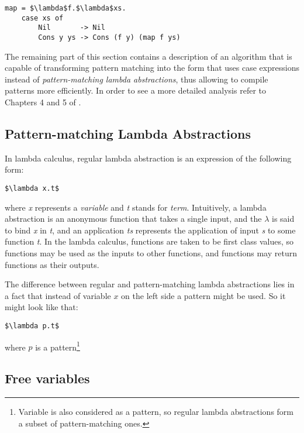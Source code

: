 \documentclass[12pt,a4paper]{report}
\begin{document}
\hspace*{-1.5in}
\begin{lstlisting}[style=haskell,mathescape=true]
map = $\lambda$f.$\lambda$xs.
    case xs of
        Nil       -> Nil
        Cons y ys -> Cons (f y) (map f ys)
\end{lstlisting}

The remaining part of this section contains a description of an algorithm that
is capable of transforming pattern matching into the form that uses case
expressions instead of \textit{pattern-matching lambda abstractions}, thus allowing to
compile patterns more efficiently. In order to see a more detailed analysis
refer to Chapters 4 and 5 of \cite{Jon87}.

\subsection{Pattern-matching Lambda Abstractions}
In lambda calculus, regular lambda abstraction is an expression of the
following form:

\hspace*{-1.5in}
\begin{lstlisting}[style=haskell,mathescape=true]
$\lambda x.t$
\end{lstlisting}
where \textit{x} represents a \textit{variable} and \textit{t} stands for
\textit{term}. Intuitively, a lambda abstraction is an anonymous function that
takes a single input, and the \(\lambda\) is said to bind \textit{x} in
\textit{t}, and an application \textit{ts} represents the application of input
\textit{s} to some function \textit{t}. In the lambda calculus, functions are
taken to be first class values, so functions may be used as the inputs to other
functions, and functions may return functions as their outputs.

The difference between regular and pattern-matching lambda abstractions lies in
a fact that instead of variable $x$ on the left side a pattern might be
used. So it might look like that:

\hspace*{-1.5in}
\begin{lstlisting}[style=haskell,mathescape=true]
$\lambda p.t$
\end{lstlisting}
where $p$ is a pattern\footnote{Variable is also considered as a
pattern, so regular lambda abstractions form a subset of pattern-matching ones.}

\subsection{Free variables}
\label{sec:free_variable}
\end{document}
